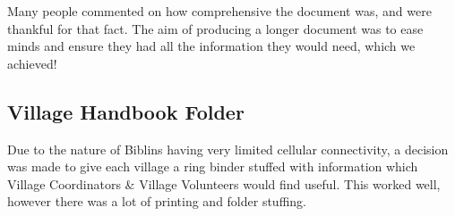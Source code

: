 Many people commented on how comprehensive the document was, and were thankful for that fact. The aim of producing a longer document was to ease minds and ensure they had all the information they would need, which we achieved!\\

\subsection{Village Handbook Folder}
Due to the nature of Biblins having very limited cellular connectivity, a decision was made to give each village a ring binder stuffed with information which Village Coordinators \& Village Volunteers would find useful. This worked well, however there was a lot of printing and folder stuffing. \\

